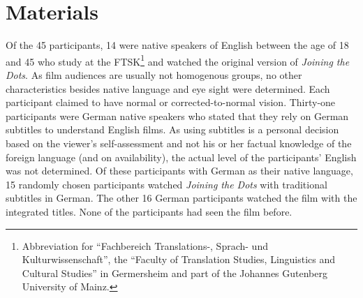 \documentclass[output=paper]{langsci/langscibook}
\begin{document}
\section{Materials}

Of the 45 participants, 14 were native speakers of English between the age of 18 and 45 who study at the FTSK\footnote{Abbreviation for ``Fachbereich Translations-, Sprach- und Kulturwissenschaft'', the ``Faculty of Translation Studies, Linguistics and Cultural Studies'' in Germersheim and part of the Johannes Gutenberg University of Mainz.} and watched the original version of \textit{Joining the Dots}. As film audiences are usually not homogenous groups, no other characteristics besides native language and eye sight were determined. Each participant claimed to have normal or corrected-to-normal vision. Thirty-one participants were German native speakers who stated that they rely on German subtitles to understand English films. As using subtitles is a personal decision based on the viewer's self-assessment and not his or her factual knowledge of the foreign language (and on availability), the actual level of the participants' English was not determined. Of these participants with German as their native language, 15 randomly chosen participants watched \textit{Joining the Dots} with traditional subtitles in German. The other 16 German participants watched the film with the integrated titles. None of the participants had seen the film before.
\end{document}
